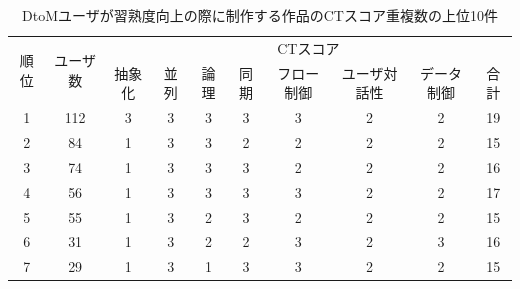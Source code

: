 \documentclass[submit,ses,noauthor]{ipsj}
\begin{document}
\begin{table}[]
\caption{DtoMユーザが習熟度向上の際に制作する作品のCTスコア重複数の上位10件}
  \label{tab:ranking-dtom}
  \vspace{2mm}
  \centering
\begin{tabular}{c|c|cccccccc}
\hline
\multirow{2}{*}{順位} & \multirow{2}{*}{ユーザ数} & \multicolumn{8}{c}{CTスコア}                                                                                                                                                         \\ \cline{3-10} 
                    &                      & \multicolumn{1}{c|}{抽象化} & \multicolumn{1}{c|}{並列} & \multicolumn{1}{c|}{論理} & \multicolumn{1}{c|}{同期} & \multicolumn{1}{c|}{フロー制御} & \multicolumn{1}{c|}{ユーザ対話性} & \multicolumn{1}{c|}{データ制御} & 合計 \\ \hline \hline
1                   & 112                  & \multicolumn{1}{c|}{3} & \multicolumn{1}{c|}{3} & \multicolumn{1}{c|}{3} & \multicolumn{1}{c|}{3} & \multicolumn{1}{c|}{3} & \multicolumn{1}{c|}{2} & \multicolumn{1}{c|}{2} & 19  \\ \hline
2                   & 84                  & \multicolumn{1}{c|}{1} & \multicolumn{1}{c|}{3} & \multicolumn{1}{c|}{3} & \multicolumn{1}{c|}{2} & \multicolumn{1}{c|}{2} & \multicolumn{1}{c|}{2} & \multicolumn{1}{c|}{2} & 15  \\ \hline
3                   & 74                  & \multicolumn{1}{c|}{1} & \multicolumn{1}{c|}{3} & \multicolumn{1}{c|}{3} & \multicolumn{1}{c|}{3} & \multicolumn{1}{c|}{2} & \multicolumn{1}{c|}{2} & \multicolumn{1}{c|}{2} & 16  \\ \hline
4                   & 56                  & \multicolumn{1}{c|}{1} & \multicolumn{1}{c|}{3} & \multicolumn{1}{c|}{3} & \multicolumn{1}{c|}{3} & \multicolumn{1}{c|}{3} & \multicolumn{1}{c|}{2} & \multicolumn{1}{c|}{2} & 17  \\ \hline
5                   & 55                  & \multicolumn{1}{c|}{1} & \multicolumn{1}{c|}{3} & \multicolumn{1}{c|}{2} & \multicolumn{1}{c|}{3} & \multicolumn{1}{c|}{2} & \multicolumn{1}{c|}{2} & \multicolumn{1}{c|}{2} & 15  \\ \hline
6                   & 31                   & \multicolumn{1}{c|}{1} & \multicolumn{1}{c|}{3} & \multicolumn{1}{c|}{2} & \multicolumn{1}{c|}{2} & \multicolumn{1}{c|}{3} & \multicolumn{1}{c|}{2} & \multicolumn{1}{c|}{3} & 16  \\ \hline
7                   & 29                   & \multicolumn{1}{c|}{1} & \multicolumn{1}{c|}{3} & \multicolumn{1}{c|}{1} & \multicolumn{1}{c|}{3} & \multicolumn{1}{c|}{3} & \multicolumn{1}{c|}{2} & \multicolumn{1}{c|}{2} & 15 \\ \hline

\end{tabular}
\end{table}
\end{document}
